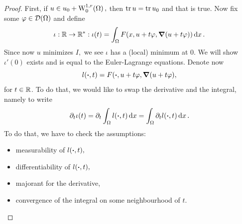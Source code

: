 \documentclass{article}
\begin{document}
\begin{proof}
	First, if $u \in u_0 + \WkpzeroSet[1][r]{\Omega},$ then $\tr u = \tr u_0$ and that is true. Now fix some $\varphi \in \mathcal{D}\qty(\Omega)$ and define
	\[
		\iota: {\mathbb R} \to {\mathbb R}^{*}: \iota\qty(t) = \int_{\Omega}F\qty(x, u + t \varphi, \grad\qty(u+ t \varphi))\dd{x}.
	\]
	Since now $u$ minimizes $I,$ we see $\iota$ has a (local) minimum at $0.$ We will show $\iota'(0)$ exists and is equal to the Euler-Lagrange equations. 
	Denote now
	\[
		l(\vdot, t) = F(\vdot, u + t \varphi, \grad \qty(u + t \varphi),
	\]
	for $t \in {\mathbb R}$. To do that, we would like to swap the derivative and the integral, namely to write
	\[
		\partial_t \iota(t)  = \partial_t \int_{\Omega}l\qty(\vdot, t)\dd{x} = \int_{\Omega}\partial_t l\qty(\vdot, t)\dd{x}.
	\]
	To do that, we have to check the assumptions: 
	\begin{itemize}
		\item measurability of $l(\vdot,t),$
		\item differentiability of $l\qty(\vdot,t),$
		\item majorant for the derivative,
		\item convergence of the integral on some neighbourhood of $t$.
	\end{itemize}


\end{proof}
\end{document}
